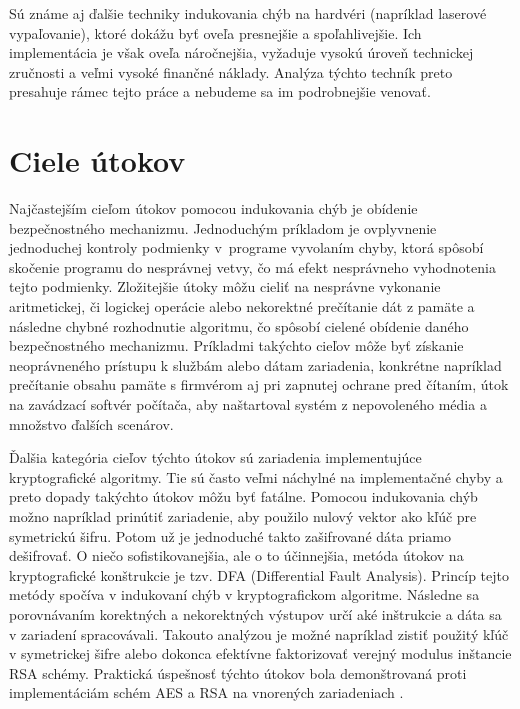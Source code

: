 Sú známe aj ďalšie techniky indukovania chýb na hardvéri (napríklad laserové vypaľovanie), ktoré dokážu byť oveľa presnejšie a spoľahlivejšie. Ich implementácia je však oveľa náročnejšia, vyžaduje vysokú úroveň technickej zručnosti a veľmi vysoké finančné náklady. Analýza týchto techník preto presahuje rámec tejto práce a nebudeme sa im podrobnejšie venovať.

\section{Ciele útokov}
Najčastejším cieľom útokov pomocou indukovania chýb je obídenie bezpečnostného mechanizmu. Jednoduchým príkladom je ovplyvnenie jednoduchej kontroly podmienky v~programe vyvolaním chyby, ktorá spôsobí skočenie programu do nesprávnej vetvy, čo má efekt nesprávneho vyhodnotenia tejto podmienky. Zložitejšie útoky môžu cieliť na nesprávne vykonanie aritmetickej, či logickej operácie alebo nekorektné prečítanie dát z pamäte a následne chybné rozhodnutie algoritmu, čo spôsobí cielené obídenie daného bezpečnostného mechanizmu. Príkladmi takýchto cieľov môže byť získanie neoprávneného prístupu k službám alebo dátam zariadenia, konkrétne napríklad prečítanie obsahu pamäte s firmvérom aj pri zapnutej ochrane pred čítaním, útok na zavádzací softvér počítača, aby naštartoval systém z nepovoleného média a množstvo ďalších scenárov.

Ďalšia kategória cieľov týchto útokov sú zariadenia implementujúce kryptografické algoritmy. Tie sú často veľmi náchylné na implementačné chyby a preto dopady takýchto útokov môžu byť fatálne. Pomocou indukovania chýb možno napríklad prinútiť zariadenie, aby použilo nulový vektor ako kľúč pre symetrickú šifru. Potom už je jednoduché takto zašifrované dáta priamo dešifrovať. O niečo sofistikovanejšia, ale o to účinnejšia, metóda útokov na kryptografické konštrukcie je tzv. DFA (Differential Fault Analysis). Princíp tejto metódy spočíva v indukovaní chýb v kryptografickom algoritme. Následne sa porovnávaním korektných a nekorektných výstupov určí aké inštrukcie a dáta sa v zariadení spracovávali. Takouto analýzou je možné napríklad zistiť použitý kľúč v symetrickej šifre alebo dokonca efektívne faktorizovať verejný modulus inštancie RSA schémy. Praktická úspešnosť týchto útokov bola demonštrovaná proti implementáciám schém AES a RSA na vnorených zariadeniach \cite{crypto}.

